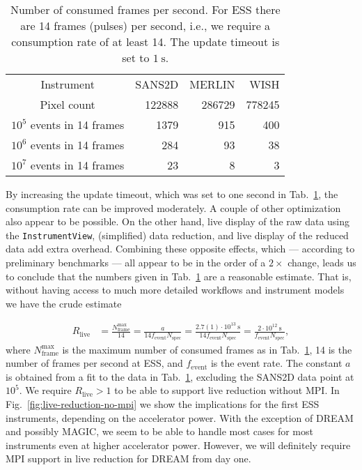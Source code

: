 \documentclass[a4paper,english,numbers=noenddot,bibliography=totoc,chapterprefix=on,DIV=12]{scrartcl}
\newcommand{\Nspec}{N_{\text{spec}}}
\newcommand{\Fevent}{f_{\text{event}}}
\newcommand{\dream}{DREAM\xspace}
\newcommand{\magic}{MAGIC\xspace}
\begin{document}
\begin{table}
  \centering
  \begin{tabular}{c|rrr}
    Instrument & SANS2D & MERLIN & WISH\\
    Pixel count & 122888 & 286729 & 778245\\
    \hline
    $10^5$ events in 14 frames & 1379 & 915 & 400 \\
    $10^6$ events in 14 frames & 284 & 93 & 38 \\
    $10^7$ events in 14 frames & 23 & 8 & 3 \\
  \end{tabular}
  \caption{\label{tab:consumption-rate}Number of consumed frames per second. For ESS there are 14 frames (pulses) per second, i.e., we require a consumption rate of at least 14. The update timeout is set to $1~\mathrm{s}$.}
\end{table}

By increasing the update timeout, which was set to one second in Tab.~\ref{tab:consumption-rate}, the consumption rate can be improved moderately.
A couple of other optimization also appear to be possible.
On the other hand, live display of the raw data using the \verb|InstrumentView|, (simplified) data reduction, and live display of the reduced data add extra overhead.
Combining these opposite effects, which --- according to preliminary benchmarks --- all appear to be in the order of a $2\times$ change, leads us to conclude that the numbers given in Tab.~\ref{tab:consumption-rate} are a reasonable estimate.
That is, without having access to much more detailed workflows and instrument models we have the crude estimate

\begin{align}
  R_{\text{live}} &= \frac{N_{\text{frame}}^{\text{max}}}{14} = \frac{a}{14\Fevent\Nspec} = \frac{2.7(1)\cdot10^{13}~\mathrm{s}}{14\Fevent\Nspec} = \frac{2\cdot10^{12}~\mathrm{s}}{\Fevent\Nspec},
\end{align}
where $N_{\text{frame}}^{\text{max}}$ is the maximum number of consumed frames as in Tab.~\ref{tab:consumption-rate}, 14 is the number of frames per second at ESS, and $\Fevent$ is the event rate.
The constant $a$ is obtained from a fit to the data in Tab.~\ref{tab:consumption-rate}, excluding the SANS2D data point at $10^5$.
We require $R_{\text{live}} > 1$ to be able to support live reduction without MPI.
In Fig.~\ref{fig:live-reduction-no-mpi} we show the implications for the first ESS instruments, depending on the accelerator power.
With the exception of \dream and possibly \magic, we seem to be able to handle most cases for most instruments even at higher accelerator power.
However, we will definitely require MPI support in live reduction for \dream from day one.
\end{document}
